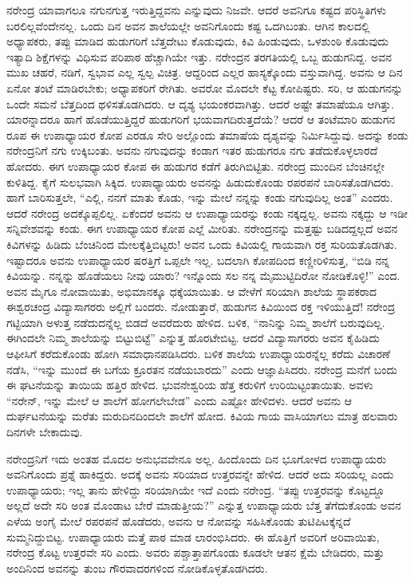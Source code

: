 ನರೇಂದ್ರ ಯಾವಾಗಲೂ ನಗುನಗುತ್ತ ಇರುತ್ತಿದ್ದವನು ಎನ್ನುವುದು ನಿಜವೇ. ಆದರೆ ಅವನಿಗೂ ಕಷ್ಟದ ಪರಿಸ್ಥಿತಿಗಳು ಬರಲಿಲ್ಲವೆಂದೇನಲ್ಲ. ಒಂದು ದಿನ ಅವನ ಶಾಲೆಯಲ್ಲೇ ಅವನಿಗೊಂದು ಕಷ್ಟ ಒದಗಿಬಂತು. ಆಗಿನ ಕಾಲದಲ್ಲಿ ಅಧ್ಯಾಪಕರು, ತಪ್ಪು ಮಾಡಿದ ಹುಡುಗರಿಗೆ ಬೆತ್ತದೇಟು ಕೊಡುವುದು, ಕಿವಿ ಹಿಂಡುವುದು, ಒಳಶುಂಠಿ ಕೊಡುವುದು ಇತ್ಯಾದಿ ಶಿಕ್ಷೆಗಳನ್ನು ವಿಧಿಸುವ ಪರಿಪಾಠ ಹೆಚ್ಚಾಗಿಯೇ ಇತ್ತು. ನರೇಂದ್ರನ ತರಗತಿಯಲ್ಲಿ ಒಬ್ಬ ಹುಡುಗನಿದ್ದ. ಅವನ ಮುಖ ಚಹರೆ, ನಡಿಗೆ, ಸ್ವಭಾವ ಎಲ್ಲ ಸ್ವಲ್ಪ ವಿಚಿತ್ರ. ಆದ್ದರಿಂದ ಎಲ್ಲರ ಹಾಸ್ಯಕ್ಕೊಂದು ವಸ್ತುವಾಗಿದ್ದ. ಅವನು ಆ ದಿನ ಏನೋ ತಂಟೆ ಮಾಡಿರಬೇಕು; ಅಧ್ಯಾಪಕರಿಗೆ ರೇಗಿತು. ಅವರೋ ಮೊದಲೇ ಕೆಟ್ಟ ಕೋಪಿಷ್ಟರು. ಸರಿ, ಆ ಹುಡುಗನನ್ನು ಒಂದೇ ಸಮನೆ ಬೆತ್ತದಿಂದ ಥಳಿಸತೊಡಗಿದರು. ಆ ದೃಶ್ಯ ಭಯಂಕರವಾಗಿತ್ತು. ಆದರೆ ಅಷ್ಟೇ ತಮಾಷೆಯೂ ಆಗಿತ್ತು. ಯಾರನ್ನಾದರೂ ಹಾಗೆ ಹೊಡೆಯುತ್ತಿದ್ದರೆ ಹುಡುಗರಿಗೆ ಭಯವಾಗದಿರುತ್ತದೆಯೆ? ಆದರೆ ಆ ತಂಟೆಮಾರಿ ಹುಡುಗನ ರೂಪ ಈ ಉಪಾಧ್ಯಾಯರ ಕೋಪ ಎರಡೂ ಸೇರಿ ಅಲ್ಲೊಂದು ತಮಾಷೆಯ ದೃಶ್ಯವನ್ನು ನಿರ್ಮಿಸಿದ್ದುವು. ಅದನ್ನು ಕಂಡು ನರೇಂದ್ರನಿಗೆ ನಗು ಉಕ್ಕಿಬಂತು. ಅವನು ನಗುವುದನ್ನು ಕಂಡಾಗ ಇತರ ಹುಡುಗರೂ ನಗು ತಡೆದುಕೊಳ್ಳಲಾರದೆ ಹೋದರು. ಈಗ ಉಪಾಧ್ಯಾಯರ ಕೋಪ ಈ ಹುಡುಗರ ಕಡೆಗೆ ತಿರುಗಿಬಿಟ್ಟಿತು. ನರೇಂದ್ರ ಮುಂದಿನ ಬೆಂಚಿನಲ್ಲೇ ಕುಳಿತಿದ್ದ. ಕೈಗೆ ಸುಲಭವಾಗಿ ಸಿಕ್ಕಿದ. ಉಪಾಧ್ಯಾಯರು ಅವನನ್ನು ಹಿಡುದುಕೊಂಡು ರಪರಪನೆ ಬಾರಿಸತೊಡಗಿದರು. ಹಾಗೆ ಬಾರಿಸುತ್ತಲೇ, “ಎಲ್ಲಿ, ನನಗೆ ಮಾತು ಕೊಡು, ಇನ್ನು ಮೇಲೆ ನನ್ನನ್ನು ಕಂಡು ನಗುವುದಿಲ್ಲ ಅಂತ” ಎಂದರು. ಆದರೆ ನರೇಂದ್ರ ಅದಕ್ಕೊಪ್ಪಲಿಲ್ಲ. ಏಕೆಂದರೆ ಅವನು ಆ ಉಪಾಧ್ಯಾಯರನ್ನು ಕಂಡು ನಕ್ಕದ್ದಲ್ಲ. ಅವನು ನಕ್ಕದ್ದು ಆ ಇಡೀ ಸನ್ನಿವೇಶವನ್ನು ಕಂಡು. ಈಗ ಉಪಾಧ್ಯಾಯರ ಕೋಪ ಎಲ್ಲೆ ಮೀರಿತು. ನರೇಂದ್ರನನ್ನು ಮತ್ತಷ್ಟು ಬಡಿದದ್ದಲ್ಲದೆ ಅವನ ಕಿವಿಗಳನ್ನು ಹಿಡಿದು ಬೆಂಚಿನಿಂದ ಮೇಲಕ್ಕೆತ್ತಿಬಿಟ್ಟರು! ಅವನ ಒಂದು ಕಿವಿಯಲ್ಲಿ ಗಾಯವಾಗಿ ರಕ್ತ ಸುರಿಯತೊಡಗಿತು. ಇಷ್ಟಾದರೂ ಅವನು ಉಪಾಧ್ಯಾಯರ ಷರತ್ತಿಗೆ ಒಪ್ಪಲೇ ಇಲ್ಲ. ಬದಲಾಗಿ ಕೋಪದಿಂದ ಕಣ್ಣೀರಿಳಿಸುತ್ತ, “ಬಿಡಿ ನನ್ನ ಕಿವಿಯನ್ನು. ನನ್ನನ್ನು ಹೊಡೆಯಲು ನೀವು ಯಾರು? ಇನ್ನೊಂದು ಸಲ ನನ್ನ ಮೈಮುಟ್ಟಿದಿರೋ ನೋಡಿಕೊಳ್ಳಿ!” ಎಂದ. ಅವನ ಮೈಗೂ ನೋವಾಯಿತು, ಅಭಿಮಾನಕ್ಕೂ ಧಕ್ಕೆಯಾಯಿತು. ಆ ವೇಳೆಗೆ ಸರಿಯಾಗಿ ಶಾಲೆಯ ಸ್ಥಾಪಕರಾದ ಈಶ್ವರಚಂದ್ರ ವಿದ್ಯಾಸಾಗರರು ಅಲ್ಲಿಗೆ ಬಂದರು. ನೋಡುತ್ತಾರೆ, ಹುಡುಗನ ಕಿವಿಯಿಂದ ರಕ್ತ ಇಳಿಯುತ್ತಿದೆ! ನರೇಂದ್ರ ಗಟ್ಟಿಯಾಗಿ ಅಳುತ್ತ ನಡೆದುದನ್ನೆಲ್ಲ ಬಿಡದೆ ಅವರೆದುರು ಹೇಳಿದ. ಬಳಿಕ, “ನಾನಿನ್ನು ನಿಮ್ಮ ಶಾಲೆಗೆ ಬರುವುದಿಲ್ಲ. ಈಗಿಂದಲೇ ನಿಮ್ಮ ಶಾಲೆಯನ್ನು ಬಿಟ್ಟುಬಿಟ್ಟೆ” ಎನ್ನುತ್ತ ಹೊರಟೇಬಿಟ್ಟ. ಆದರೆ ವಿದ್ಯಾಸಾಗರರು ಅವನ ಕೈಹಿಡಿದು ಆಫೀಸಿಗೆ ಕರೆದುಕೊಂಡು ಹೋಗಿ ಸಮಾಧಾನಪಡಿಸಿದರು. ಬಳಿಕ ಶಾಲೆಯ ಉಪಾಧ್ಯಾಯರನ್ನೆಲ್ಲ ಕರೆದು ವಿಚಾರಣೆ ನಡೆಸಿ, “ಇನ್ನು ಮುಂದೆ ಈ ಬಗೆಯ ಕ್ರೂರತನ ನಡೆಯಬಾರದು” ಎಂದು ಆಜ್ಞಾಪಿಸಿದರು. ನರೇಂದ್ರ ಮನೆಗೆ ಬಂದು ಈ ಘಟನೆಯನ್ನು ತಾಯಿಯ ಹತ್ತಿರ ಹೇಳಿದ. ಭುವನೇಶ್ವರಿಯ ಹೆತ್ತ ಕರುಳಿಗೆ ಉರಿಯಿಟ್ಟಂತಾಯಿತು. ಅವಳು “ನರೇನ್, ಇನ್ನು ಮೇಲೆ ಆ ಶಾಲೆಗೆ ಹೋಗಲೇಬೇಡ” ಎಂದು ಎಷ್ಟೋ ಹೇಳಿದಳು. ಆದರೆ ಅವನು ಆ ದುರ್ಘಟನೆಯನ್ನು ಮರೆತು ಮರುದಿನದಿಂದಲೇ ಶಾಲೆಗೆ ಹೋದ. ಕಿವಿಯ ಗಾಯ ವಾಸಿಯಾಗಲು ಮಾತ್ರ ಹಲವಾರು ದಿನಗಳೇ ಬೇಕಾದುವು.

ನರೇಂದ್ರನಿಗೆ ಇದು ಅಂತಹ ಮೊದಲ ಅನುಭವವೇನೂ ಅಲ್ಲ. ಹಿಂದೊಂದು ದಿನ ಭೂಗೋಳದ ಉಪಾಧ್ಯಾಯರು ಅವನಿಗೊಂದು ಪ್ರಶ್ನೆ ಹಾಕಿದ್ದರು. ಅದಕ್ಕೆ ಅವನು ಸರಿಯಾದ ಉತ್ತರವನ್ನೇ ಹೇಳಿದ. ಆದರೆ ಅದು ಸರಿಯಲ್ಲ ಎಂದು ಉಪಾಧ್ಯಾಯರು; ಇಲ್ಲ ತಾನು ಹೇಳಿದ್ದು ಸರಿಯಾಗಿಯೇ ಇದೆ ಎಂದು ನರೇಂದ್ರ. “ತಪ್ಪು ಉತ್ತರವನ್ನು ಕೊಟ್ಟದ್ದೂ ಅಲ್ಲದೆ ಅದೇ ಸರಿ ಅಂತ ಮೊಂಡಾಟ ಬೇರೆ ಮಾಡುತ್ತೀಯ?” ಎನ್ನುತ್ತ ಉಪಾಧ್ಯಾಯರು ಬೆತ್ತ ತೆಗೆದುಕೊಂಡು ಅವನ ಎಳೆಯ ಅಂಗೈ ಮೇಲೆ ರಪರಪನೆ ಹೊಡೆದರು, ಅವನು ಆ ನೋವನ್ನು ಸಹಿಸಿಕೊಂಡು ತುಟಿಪಿಟಕ್ಕೆನ್ನದೆ ಸುಮ್ಮನಿದ್ದುಬಿಟ್ಟ. ಉಪಾಧ್ಯಾಯರು ಮತ್ತೆ ಪಾಠ ಮಾಡ ಲಾರಂಭಿಸಿದರು. ಈ ಹೊತ್ತಿಗೆ ಅವರಿಗೆ ಅರಿವಾಯಿತು, ನರೇಂದ್ರ ಕೊಟ್ಟ ಉತ್ತರವೇ ಸರಿ ಎಂದು. ಅವರು ಪಶ್ಚಾತ್ತಾಪಗೊಂಡು ಕೂಡಲೇ ಆತನ ಕ್ಷೆಮೆ ಬೇಡಿದರು, ಮತ್ತು ಅಂದಿನಿಂದ ಅವನನ್ನು ತುಂಬ ಗೌರವಾದರಗಳಿಂದ ನೋಡಿಕೊಳ್ಳತೊಡಗಿದರು.

